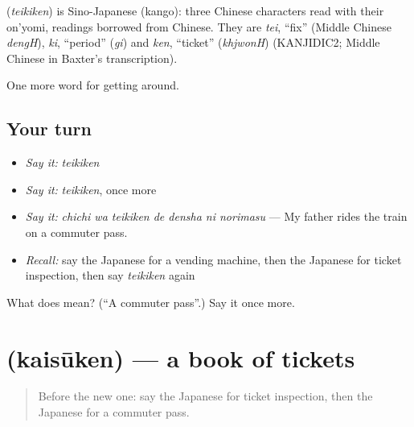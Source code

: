 \begin{cousinweb}
\textbf{} (\emph{teikiken}) is Sino-Japanese (kango): three Chinese characters read with their on'yomi, readings borrowed from Chinese. They are \emph{tei}, \textquotedblleft{}fix\textquotedblright{} (Middle Chinese \emph{dengH}), \emph{ki}, \textquotedblleft{}period\textquotedblright{} (\emph{gi}) and \emph{ken}, \textquotedblleft{}ticket\textquotedblright{} (\emph{khjwonH}) (KANJIDIC2; Middle Chinese in Baxter's transcription).
\end{cousinweb}

\begin{grammarlens}[title={What you've built}]
One more word for getting around.
\end{grammarlens}

\subsection*{Your turn}
\begin{itemize}
\raggedright
  \item \emph{Say it:} \emph{teikiken}
  \item \emph{Say it:} \emph{teikiken}, once more
  \item \emph{Say it:} \emph{chichi wa teikiken de densha ni norimasu} — My father rides the train on a commuter pass.
  \item \emph{Recall:} say the Japanese for a vending machine, then the Japanese for ticket inspection, then say \emph{teikiken} again
\end{itemize}

\begin{tcolorbox}[breakable,colback=teal!4,colframe=teal!35!black,title={Before you move on}]
What does  mean? (\textquotedblleft{}A commuter pass\textquotedblright{}.) Say it once more.
\end{tcolorbox}
\section[\texorpdfstring{\ja{かいすうけん} (kaisūken)}{かいすうけん (kaisūken)}]{ (kaisūken) — a book of tickets}

\label{lesson:JA-C373-kaisuuken}



\begin{quote}
Before the new one: say the Japanese for ticket inspection, then the Japanese for a commuter pass.
\end{quote}

